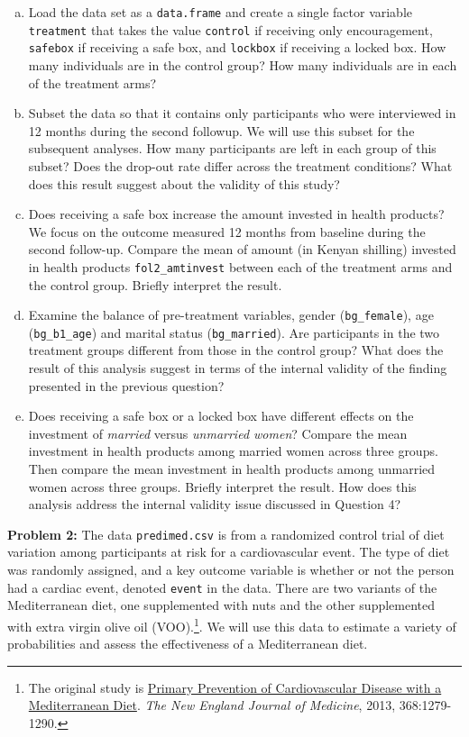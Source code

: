 \documentclass[11pt]{article}
\begin{document}
\begin{enumerate}[a.]
	\item Load the data set as a {\tt data.frame} and create a single factor variable {\tt treatment} that takes the value {\tt control} if receiving only encouragement, {\tt safebox} if receiving a safe box,  and {\tt lockbox} if receiving a locked box. How many individuals are in the control group? How many individuals are in each of the treatment arms?
	\item Subset the data so that it contains only participants who were interviewed in 12 months during the second followup.  We will use this subset for the subsequent analyses. How many participants are left in each group of this subset?  Does the drop-out rate differ across the treatment conditions?  What does this result suggest about the validity of this study? 
	\item Does receiving a safe box increase the amount invested in health products? We focus on the outcome measured 12 months from baseline during the second follow-up. Compare the mean of amount (in Kenyan shilling) invested in health products {\tt fol2_amtinvest} between each of the treatment arms and the control group. Briefly interpret the result.
	\item Examine the balance of pre-treatment variables, gender ({\tt bg_female}), age ({\tt bg_b1_age}) and marital status ({\tt bg_married}). Are participants in the two treatment groups different from those in the control group?  What does the result of this analysis suggest in terms of the internal validity of the finding presented in the previous question?
	\item Does receiving a safe box or a locked box have different effects on the investment of {\it married} versus {\it unmarried women}? Compare the mean investment in health products among married women across three groups. Then compare the mean investment in health products among unmarried women across three groups. Briefly interpret the result.  How does this analysis address the internal validity issue discussed in Question 4? 
\end{enumerate}
\vspace{7mm}
\noindent \textbf{Problem 2:} The data {\tt predimed.csv} is from a randomized control trial of diet variation among participants at risk for a cardiovascular event.  The type of diet was randomly assigned, and a key outcome variable is whether or not the person had a cardiac event, denoted {\tt event} in the data.  There are two variants of the Mediterranean diet, one supplemented with nuts and the other supplemented with extra virgin olive oil (VOO).\footnote{The original study is \href{https://www.nejm.org/doi/full/10.1056/NEJMoa1200303}{Primary Prevention of Cardiovascular Disease with a Mediterranean Diet}. \textit{The New England Journal of Medicine}, 2013, 368:1279-1290.}. We will use this data to estimate a variety of probabilities and assess the effectiveness of a Mediterranean diet.
\end{document}
